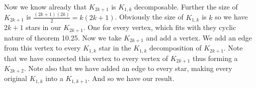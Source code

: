 \documentclass[letterpaper]{article}
\begin{document}
\begin{enumerate}
\begin{enumerate}
\begin{enumerate}
    Now we know already that $K_{2k+1}$ is $K_{1,k}$ decomposable. Further the size of $K_{2k+1}$ is $\frac{(2k+1)(2k)}{2}=k(2k+1)$. Obviously the size of $K_{1,k}$ is $k$ so we have $2k+1$ stars in our $K_{2k+1}$. One for every vertex, which fits with they cyclic nature of theorem 10.25. Now we take $K_{2k+1}$ and add a vertex. We add an edge from this vertex to every $K_{1,k}$ star in the $K_{1,k}$ decomposition of $K_{2k+1}$. Note that we have connected this vertex to every vertex of $K_{2k+1}$ thus forming a $K_{2k+2}$. Note also that we have added an edge to every star, making every original $K_{1,k}$ into a $K_{1,k+1}$. And so we have our result.
  
  \end{enumerate}

\end{enumerate}
\end{enumerate}
\end{document}

